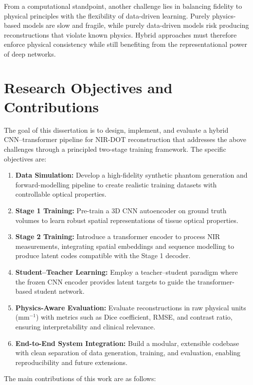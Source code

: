 From a computational standpoint, another challenge lies in balancing fidelity to physical principles with the flexibility of data-driven learning. Purely physics-based models are slow and fragile, while purely data-driven models risk producing reconstructions that violate known physics. Hybrid approaches must therefore enforce physical consistency while still benefiting from the representational power of deep networks.

\section{Research Objectives and Contributions}

The goal of this dissertation is to design, implement, and evaluate a hybrid CNN–transformer pipeline for NIR-DOT reconstruction that addresses the above challenges through a principled two-stage training framework. The specific objectives are:

\begin{enumerate}
    \item \textbf{Data Simulation:} Develop a high-fidelity synthetic phantom generation and forward-modelling pipeline to create realistic training datasets with controllable optical properties.
    \item \textbf{Stage 1 Training:} Pre-train a 3D CNN autoencoder on ground truth volumes to learn robust spatial representations of tissue optical properties.
    \item \textbf{Stage 2 Training:} Introduce a transformer encoder to process NIR measurements, integrating spatial embeddings and sequence modelling to produce latent codes compatible with the Stage 1 decoder.
    \item \textbf{Student–Teacher Learning:} Employ a teacher–student paradigm where the frozen CNN encoder provides latent targets to guide the transformer-based student network.
    \item \textbf{Physics-Aware Evaluation:} Evaluate reconstructions in raw physical units (mm$^{-1}$) with metrics such as Dice coefficient, RMSE, and contrast ratio, ensuring interpretability and clinical relevance.
    \item \textbf{End-to-End System Integration:} Build a modular, extensible codebase with clean separation of data generation, training, and evaluation, enabling reproducibility and future extensions.
\end{enumerate}

The main contributions of this work are as follows:

